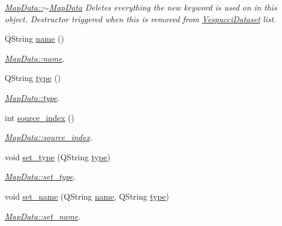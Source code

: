 \begin{DoxyCompactItemize}
\begin{DoxyCompactList}\small\item\em \hyperlink{class_map_data_afc3e096cf252c30641055ea4eaaab410}{Map\+Data\+::$\sim$\+Map\+Data} Deletes everything the new keyword is used on in this object. Destructor triggered when this is removed from \hyperlink{class_vespucci_dataset}{Vespucci\+Dataset} list. \end{DoxyCompactList}\item 
Q\+String \hyperlink{class_map_data_af829b775c94e7036c1ad5cd495c942e8}{name} ()
\begin{DoxyCompactList}\small\item\em \hyperlink{class_map_data_af829b775c94e7036c1ad5cd495c942e8}{Map\+Data\+::name}. \end{DoxyCompactList}\item 
Q\+String \hyperlink{class_map_data_aa98befcd52daa5ed565fa375c28461d4}{type} ()
\begin{DoxyCompactList}\small\item\em \hyperlink{class_map_data_aa98befcd52daa5ed565fa375c28461d4}{Map\+Data\+::type}. \end{DoxyCompactList}\item 
int \hyperlink{class_map_data_a24c45edae66512b7a7b7d62be38b91f1}{source\+\_\+index} ()
\begin{DoxyCompactList}\small\item\em \hyperlink{class_map_data_a24c45edae66512b7a7b7d62be38b91f1}{Map\+Data\+::source\+\_\+index}. \end{DoxyCompactList}\item 
void \hyperlink{class_map_data_a5ff97fbb20dfca5642ce39e26dde38af}{set\+\_\+type} (Q\+String \hyperlink{class_map_data_aa98befcd52daa5ed565fa375c28461d4}{type})
\begin{DoxyCompactList}\small\item\em \hyperlink{class_map_data_a5ff97fbb20dfca5642ce39e26dde38af}{Map\+Data\+::set\+\_\+type}. \end{DoxyCompactList}\item 
void \hyperlink{class_map_data_ab9eff280b000c33226850a6541c81f89}{set\+\_\+name} (Q\+String \hyperlink{class_map_data_af829b775c94e7036c1ad5cd495c942e8}{name}, Q\+String \hyperlink{class_map_data_aa98befcd52daa5ed565fa375c28461d4}{type})
\begin{DoxyCompactList}\small\item\em \hyperlink{class_map_data_ab9eff280b000c33226850a6541c81f89}{Map\+Data\+::set\+\_\+name}. \end{DoxyCompactList}\item 

\end{DoxyCompactItemize}
